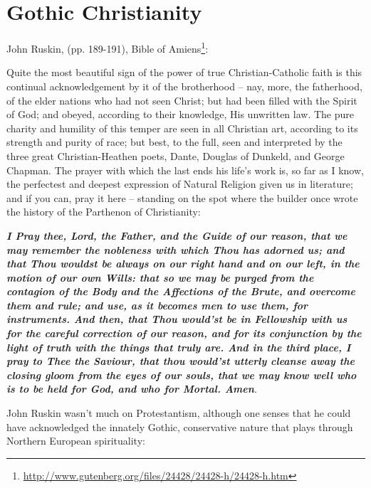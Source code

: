 \section{Gothic Christianity}

John Ruskin, (pp. 189-191), {Bible of Amiens\footnote{\url{http://www.gutenberg.org/files/24428/24428-h/24428-h.htm}}}:

\begin{quotationx}
Quite the most beautiful sign of the power of true Christian-Catholic faith is this continual acknowledgement by it of the brotherhood -- nay, more, the fatherhood, of the elder nations who had not seen Christ; but had been filled with the Spirit of God; and obeyed, according to their knowledge, His unwritten law. The pure charity and humility of this temper are seen in all Christian art, according to its strength and purity of race; but best, to the full, seen and interpreted by the three great Christian-Heathen poets, Dante, Douglas of Dunkeld, and George Chapman. The prayer with which the last ends his life's work is, so far as I know, the perfectest and deepest expression of Natural Religion given us in literature; and if you can, pray it here -- standing on the spot where the builder once wrote the history of the Parthenon of Christianity:

\emph{\textbf{I Pray thee, Lord, the Father, and the Guide of our reason, that we may remember the nobleness with which Thou has adorned us; and that Thou wouldst be always on our right hand and on our left, in the motion of our own Wills: that so we may be purged from the contagion of the Body and the Affections of the Brute, and overcome them and rule; and use, as it becomes men to use them, for instruments. And then, that Thou would'st be in Fellowship with us for the careful correction of our reason, and for its conjunction by the light of truth with the things that truly are. And in the third place, I pray to Thee the Saviour, that thou would'st utterly cleanse away the closing gloom from the eyes of our souls, that we may know well who is to be held for God, and who for Mortal. Amen}.}
\end{quotationx}


John Ruskin wasn't much on Protestantism, although one senses that he could have acknowledged the innately Gothic, conservative nature that plays through Northern European spirituality:

